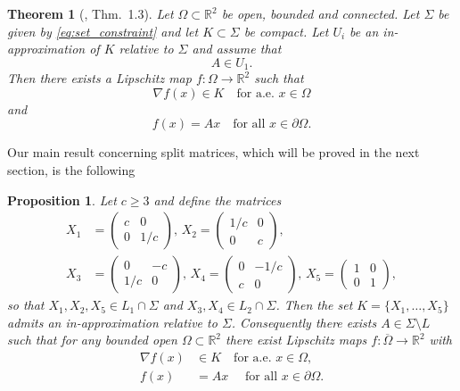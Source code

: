 \documentclass[titlepage]{amsart}
\numberwithin{equation}{section}
\theoremstyle{plain}
\newtheorem{theorem}[equation]{Theorem}
\newtheorem{proposition}[equation]{Proposition}
\theoremstyle{definition}
\theoremstyle{remark}
\newcommand{\R}{\mathbb{R}}
\newcommand{\g}{\nabla }
\begin{document}
\begin{theorem}[\cite{muller_sverak_constraint}, Thm.\ 1.3] \label{th:constraint}
Let $\Omega \subset \R^2$ be open, bounded and connected. Let $\Sigma$ be given by \eqref{eq:set_constraint}
 and let  $K \subset \Sigma$ be compact. Let $U_i$ be an in-approximation of $K$ relative to $\Sigma$ and 
assume that 
$$ A \in U_1.$$
Then there exists a Lipschitz map $f: \Omega \to \R^2$ such that 
$$ \g f(x) \in K \quad \text{for a.e.\ $x \in \Omega$} $$
and 
$$ f(x) = Ax \quad \text{for all $x \in \partial \Omega$.} $$
\end{theorem}

Our main result concerning split matrices, which will be proved in the next section, is the following
\begin{proposition}\label{prop:largeT5ex}
Let $c\geq 3$ and define the matrices 
\begin{equation}\label{T5e:ex}
\begin{split}
X_1&=\begin{pmatrix} c&0\\0&1/c\end{pmatrix},\, 
X_2=\begin{pmatrix} 1/c&0\\0&c\end{pmatrix},\\
X_3&=\begin{pmatrix} 0&-c\\1/c&0\end{pmatrix},\,
X_4=\begin{pmatrix} 0 &-1/c\\ c & 0\end{pmatrix},\,
X_5=\begin{pmatrix} 1&0\\0&1\end{pmatrix},	
\end{split}
\end{equation}
so that $X_1,X_2,X_5\in L_1\cap\Sigma$ and $X_3,X_4\in L_2\cap\Sigma$. Then the set $K=\{X_1,\dots,X_5\}$ admits an in-approximation relative to $\Sigma$. Consequently there exists $A\in \Sigma\setminus L$ such that for any bounded open $\Omega\subset\R^2$ there exist Lipschitz maps $f:\overline{\Omega}\to\R^2$ with
\begin{align*}
\g f(x)&\in K\quad \textrm{for a.e. }x\in\Omega,\\
f(x)&=Ax\quad\textrm{ for all }x\in\partial\Omega.
\end{align*}  
\end{proposition}
\end{document}
